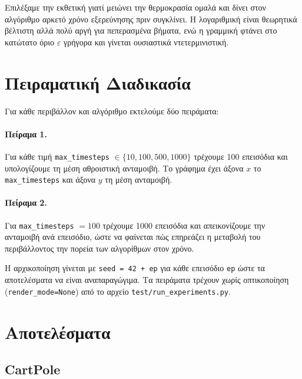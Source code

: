 \documentclass[12pt,a4paper]{article}
\begin{document}
Επιλέξαμε την εκθετική γιατί μειώνει την θερμοκρασία ομαλά και δίνει στον αλγόριθμο
αρκετό χρόνο εξερεύνησης πριν συγκλίνει. Η λογαριθμική είναι θεωρητικά βέλτιστη αλλά
πολύ αργή για πεπερασμένα βήματα, ενώ η γραμμική φτάνει στο κατώτατο όριο $\varepsilon$
γρήγορα και γίνεται ουσιαστικά ντετερμινιστική.


\newpage
\section{Πειραματική Διαδικασία}

Για κάθε περιβάλλον και αλγόριθμο εκτελούμε δύο πειράματα:

\paragraph{Πείραμα 1.}
Για κάθε τιμή \texttt{\textlatin{max\_timesteps}} $\in \{10, 100, 500, 1000\}$ τρέχουμε
100 επεισόδια και υπολογίζουμε τη μέση αθροιστική ανταμοιβή. Το γράφημα έχει άξονα $x$
το \texttt{\textlatin{max\_timesteps}} και άξονα $y$ τη μέση ανταμοιβή.

\paragraph{Πείραμα 2.}
Για \texttt{\textlatin{max\_timesteps}} $= 100$ τρέχουμε 1000 επεισόδια και
απεικονίζουμε την ανταμοιβή ανά επεισόδιο, ώστε να φαίνεται πώς επηρεάζει η
μεταβολή του περιβάλλοντος την πορεία των αλγορίθμων στον χρόνο.

Η αρχικοποίηση γίνεται με \texttt{\textlatin{seed = 42 + ep}} για κάθε επεισόδιο
\texttt{\textlatin{ep}} ώστε τα αποτελέσματα να είναι αναπαραγώγιμα. Τα πειράματα
τρέχουν χωρίς οπτικοποίηση (\texttt{\textlatin{render\_mode=None}}) από το αρχείο
\texttt{\textlatin{test/run\_experiments.py}}.


\section{Αποτελέσματα}

\subsection{\textlatin{CartPole}}
\end{document}
